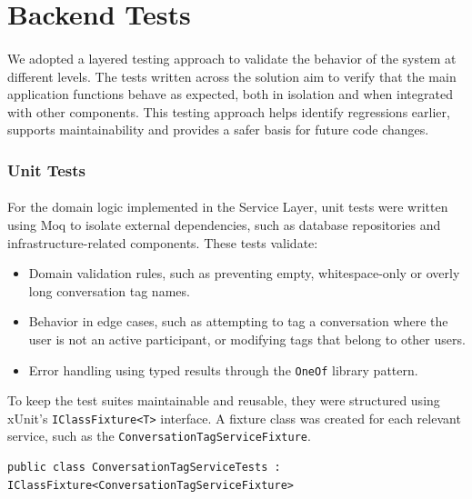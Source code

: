 \section{Backend Tests} \label{sec:backend_tests}
\paragraph{}We adopted a layered testing approach to validate the behavior of the system at different levels. The tests written across the solution aim to verify that the main application functions behave as expected, both in isolation and when integrated with other components. This testing approach helps identify regressions earlier, supports maintainability and provides a safer basis for future code changes.

\subsubsection{Unit Tests}
\paragraph{}For the domain logic implemented in the Service Layer, unit tests were written using Moq to isolate external dependencies, such as database repositories and infrastructure-related components. These tests validate:

\begin{itemize}
\item Domain validation rules, such as preventing empty, whitespace-only or overly long conversation tag names.
\item Behavior in edge cases, such as attempting to tag a conversation where the user is not an active participant, or modifying tags that belong to other users.
\item Error handling using typed results through the \texttt{OneOf} library pattern.
\end{itemize}

To keep the test suites maintainable and reusable, they were structured using xUnit's \texttt{IClassFixture<T>} interface. A fixture class was created for each relevant service, such as the \texttt{ConversationTagServiceFixture}.

\begin{lstlisting}[caption={ConversationTagServiceFixture instantiation}, label={lst:conversation-tag-fixture-init}]
public class ConversationTagServiceTests : IClassFixture<ConversationTagServiceFixture>
\end{lstlisting}

